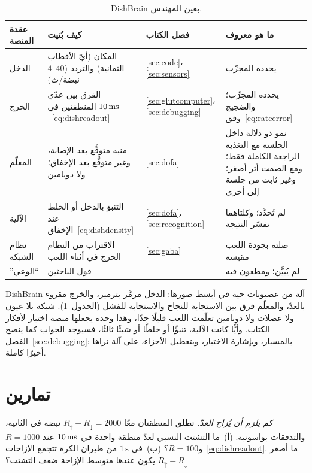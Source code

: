 \begin{table}[t]
\centering
\footnotesize
\setlength{\tabcolsep}{4pt}
\renewcommand{\arraystretch}{1.15}
\begin{tabular}{>{\raggedright}p{2.1cm}>{\raggedright}p{4.2cm}>{\raggedright}p{1.9cm}>{\raggedright\arraybackslash}p{4.6cm}}
\toprule
عقدة المنصة & كيف بُنيت & فصل الكتاب & ما هو معروف \\
\midrule
الدخل & المكان (أيّ الأقطاب الثمانية) والتردد ($4\text{--}40$ نبضة/ث) & \ref{sec:code}، \ref{sec:sensors} & يحدده المجرِّب \\
الخرج & الفرق بين عدّي المنطقتين في $10\,\text{ms}$~\eqref{eq:dishreadout} & \ref{sec:glutcomputer}، \ref{sec:debugging} & يحدده المجرِّب؛ والضجيج وفق~\eqref{eq:rateerror} \\
المعلّم & منبه متوقَّع بعد الإصابة، وغير متوقَّع بعد الإخفاق؛ ولا دوبامين & \ref{sec:dofa} & نمو ذو دلالة داخل الجلسة مع التغذية الراجعة الكاملة فقط؛ ومع الصمت أثر أصغر؛ وغير ثابت من جلسة إلى أخرى \\
الآلية & التنبؤ بالدخل أو الخلط عند الإخفاق~\eqref{eq:dishdensity} & \ref{sec:dofa}، \ref{sec:recognition} & لم تُحدَّد؛ وكلتاهما تفسّر النتيجة \\
نظام الشبكة & الاقتراب من النظام الحرج في أثناء اللعب & \ref{sec:gaba} & صلته بجودة اللعب مقيسة \\
”الوعي“ & قول الباحثين & --- & لم يُبيَّن؛ ومطعون فيه \\
\bottomrule
\end{tabular}
\caption{\foreignlanguage{english}{DishBrain} بعين المهندس.}
\label{tab:dishbrain}
\end{table}

\foreignlanguage{english}{DishBrain} آلة من عصبونات حية في أبسط صورها: الدخل مرمَّز بترميز، والخرج مقروء بالعدّ، والمعلّم فرق بين الاستجابة للنجاح والاستجابة للفشل (الجدول~\ref{tab:dishbrain}). شبكة بلا عيون ولا عضلات ولا دوبامين تعلّمت اللعب قليلًا جدًا، وهذا وحده يجعلها منصة اختبار لأفكار الكتاب. وأيًّا كانت الآلية، تنبؤًا أو خلطًا أو شيئًا ثالثًا، فسيوجد الجواب كما ينصح الفصل~\ref{sec:debugging}: بالمسبار، وبإشارة الاختبار، وبتعطيل الأجزاء، على آلة نراها أخيرًا كاملة.

\section{تمارين}

\begin{exercise}[\lvlA]
\label{ex:22:1}
\emph{كم يلزم أن يُزاح العدّ.} تطلق المنطقتان معًا $R_\uparrow+R_\downarrow=2000$ نبضة في الثانية، والتدفقات بواسونية. (أ)~ما التشتت النسبي لعدّ منطقة واحدة في $10\,\text{ms}$ عند $R=1000$ و$R=100$؟ (ب)~في $1\,\text{s}$ من طيران الكرة تتجمع الإزاحات~\eqref{eq:dishreadout}. ما أصغر $R_\uparrow-R_\downarrow$ يكون عندها متوسط الإزاحة ضعف التشتت؟
\end{exercise}

